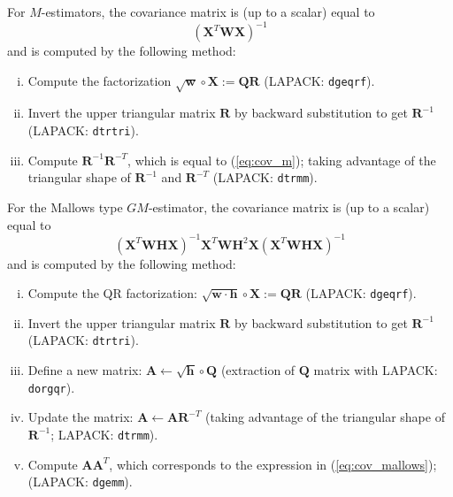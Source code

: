 \documentclass[a4paper,11pt]{scrreprt}
\theoremstyle{remark}
\newcommand{\code}[1]{{\texttt{#1}}}
\begin{document}
For $M$-estimators, the covariance matrix is (up to a scalar) equal to
\begin{equation}\label{eq:cov_m}
   (\bm X^T \bm W \bm X)^{-1}
\end{equation}
\noindent and is computed by the following method:
\begin{enumerate}[i)]
   \item Compute the factorization $\sqrt{\bm w} \circ \bm X := \bm Q \bm R$ (LAPACK: \code{dgeqrf}).
   \item Invert the upper triangular matrix $\bm R$ by backward substitution to get $\bm R^{-1}$ (LAPACK: \code{dtrtri}).
   \item Compute $\bm R^{-1} \bm R^{-T}$, which is equal to (\ref{eq:cov_m}); taking advantage of the triangular shape of $\bm R^{-1}$ and $\bm R^{-T}$ (LAPACK: \code{dtrmm}). 
\end{enumerate}

\noindent For the Mallows type $GM$-estimator, the covariance matrix is (up to a scalar) equal to
\begin{equation}\label{eq:cov_mallows}
   (\bm X^T \bm W \bm H \bm X)^{-1} \bm X^T \bm W \bm H^2 \bm X (\bm X^T \bm W \bm H \bm X)^{-1}
\end{equation}
\noindent and is computed by the following method:
\begin{enumerate}[i)]
   \item Compute the QR factorization: $\sqrt{\bm w \cdot \bm h} \circ \bm X := \bm Q \bm R$ (LAPACK: \code{dgeqrf}).   
   \item Invert the upper triangular matrix $\bm R$ by backward substitution to get $\bm R^{-1}$ (LAPACK: \code{dtrtri}).
   \item Define a new matrix: $\bm A \leftarrow \sqrt{\bm h} \circ \bm Q$ (extraction of $\bm Q$ matrix with LAPACK: \code{dorgqr}).
   \item Update the matrix: $\bm A \leftarrow \bm A \bm R^{-T}$ (taking advantage of the triangular shape of $\bm R^{-1}$; LAPACK: \code{dtrmm}). 
   \item Compute $\bm A \bm A^T$, which corresponds to the expression in (\ref{eq:cov_mallows}); (LAPACK: \code{dgemm}).  
\end{enumerate}
\end{document}
